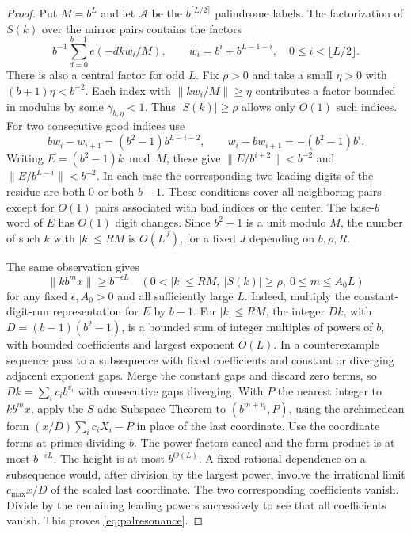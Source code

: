 \begin{proof}
Put $M=b^L$ and let $\mathcal A$ be the $b^{\lceil L/2\rceil}$ palindrome labels. The factorization of $S(k)$ over the mirror pairs contains the factors
\[
       b^{-1}\sum_{d=0}^{b-1}e(-dk w_i/M),
       \qquad w_i=b^i+b^{L-1-i},\quad 0\le i<\lfloor L/2\rfloor .
\]
There is also a central factor for odd $L$. Fix $\rho>0$ and take a small $\eta>0$ with $(b+1)\eta<b^{-2}$. Each index with $\|kw_i/M\|\ge\eta$ contributes a factor bounded in modulus by some $\gamma_{b,\eta}<1$. Thus $|S(k)|\ge\rho$ allows only $O(1)$ such indices. For two consecutive good indices use
\[
 bw_i-w_{i+1}=(b^2-1)b^{L-i-2},\qquad
 w_i-bw_{i+1}=-(b^2-1)b^i .
\]
Writing $E=(b^2-1)k\bmod M$, these give $\|E/b^{i+2}\|<b^{-2}$ and $\|E/b^{L-i}\|<b^{-2}$. In each case the corresponding two leading digits of the residue are both $0$ or both $b-1$. These conditions cover all neighboring pairs except for $O(1)$ pairs associated with bad indices or the center. The base-$b$ word of $E$ has $O(1)$ digit changes. Since $b^2-1$ is a unit modulo $M$, the number of such $k$ with $|k|\le RM$ is $O(L^J)$, for a fixed $J$ depending on $b,\rho,R$.

The same observation gives
\begin{equation}\label{eq:palresonance}
 \|k b^m x\|\ge b^{-\epsilon L}
 \quad(0<|k|\le RM,\ |S(k)|\ge\rho,\ 0\le m\le A_0 L)
\end{equation}
for any fixed $\epsilon,A_0>0$ and all sufficiently large $L$. Indeed, multiply the constant-digit-run representation for $E$ by $b-1$. For $|k|\le RM$, the integer $Dk$, with $D=(b-1)(b^2-1)$, is a bounded sum of integer multiples of powers of $b$, with bounded coefficients and largest exponent $O(L)$. In a counterexample sequence pass to a subsequence with fixed coefficients and constant or diverging adjacent exponent gaps. Merge the constant gaps and discard zero terms, so $Dk=\sum_i c_i b^{v_i}$ with consecutive gaps diverging. With $P$ the nearest integer to $k b^m x$, apply the $S$-adic Subspace Theorem to $(b^{m+v_i},P)$, using the archimedean form $(x/D)\sum_i c_i X_i-P$ in place of the last coordinate. Use the coordinate forms at primes dividing $b$. The power factors cancel and the form product is at most $b^{-\epsilon L}$. The height is at most $b^{O(L)}$. A fixed rational dependence on a subsequence would, after division by the largest power, involve the irrational limit $c_{\max}x/D$ of the scaled last coordinate. The two corresponding coefficients vanish. Divide by the remaining leading powers successively to see that all coefficients vanish. This proves \eqref{eq:palresonance}.


\end{proof}
